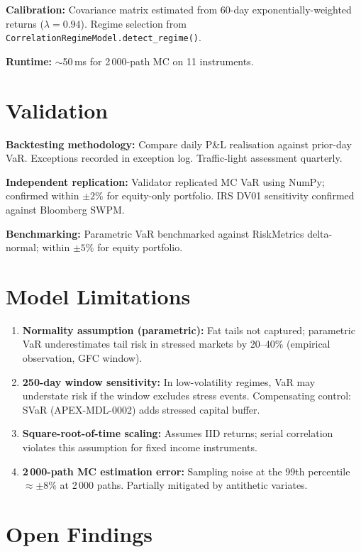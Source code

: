 \documentclass{apex_mdd}
\begin{document}
\textbf{Calibration:} Covariance matrix estimated from 60-day exponentially-weighted returns ($\lambda = 0.94$). Regime selection from \texttt{CorrelationRegimeModel.detect\_regime()}.

\textbf{Runtime:} $\sim$50\,ms for 2\,000-path MC on 11 instruments.

\section{Validation}

\textbf{Backtesting methodology:} Compare daily P\&L realisation against prior-day VaR. Exceptions recorded in exception log. Traffic-light assessment quarterly.

\textbf{Independent replication:} Validator replicated MC VaR using NumPy; confirmed within $\pm 2\%$ for equity-only portfolio. IRS DV01 sensitivity confirmed against Bloomberg SWPM.

\textbf{Benchmarking:} Parametric VaR benchmarked against RiskMetrics delta-normal; within $\pm 5\%$ for equity portfolio.

\section{Model Limitations}

\begin{enumerate}
  \item \textbf{Normality assumption (parametric):} Fat tails not captured; parametric VaR underestimates tail risk in stressed markets by 20--40\% (empirical observation, GFC window).
  \item \textbf{250-day window sensitivity:} In low-volatility regimes, VaR may understate risk if the window excludes stress events. Compensating control: SVaR (APEX-MDL-0002) adds stressed capital buffer.
  \item \textbf{Square-root-of-time scaling:} Assumes IID returns; serial correlation violates this assumption for fixed income instruments.
  \item \textbf{2\,000-path MC estimation error:} Sampling noise at the 99th percentile $\approx\pm 8\%$ at 2\,000 paths. Partially mitigated by antithetic variates.
\end{enumerate}

\section{Open Findings}

\begin{findings}
\end{findings}
\end{document}
